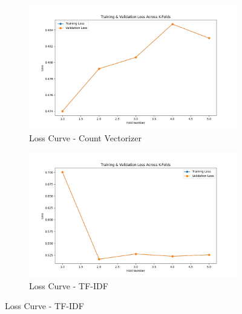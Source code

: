 \begin{figure}[H]
    \centering
    \begin{subfigure}[b]{0.44\textwidth}
        \includegraphics[width=\textwidth]{img/report_info/img/2.2.MLP/best_mlp_count_loss.png}
        \caption{Loss Curve - Count Vectorizer}
        \label{fig:mlp-count-loss}
    \end{subfigure}
    \begin{subfigure}[b]{0.44\textwidth}
        \includegraphics[width=\textwidth]{img/report_info/img/2.2.MLP/best_mlp_tfidf_loss.png}
        \caption{Loss Curve - TF-IDF}
        \label{fig:mlp-tfidf-loss}
    \end{subfigure}
    

\end{figure}

